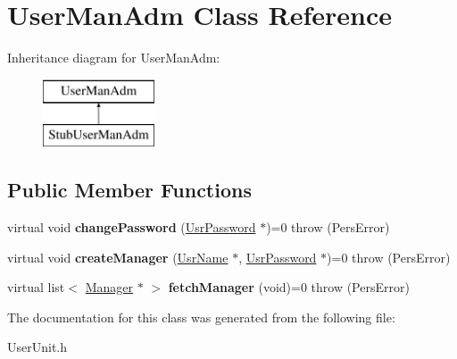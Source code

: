 \hypertarget{classUserManAdm}{\section{User\-Man\-Adm Class Reference}
\label{da/d86/classUserManAdm}
}
Inheritance diagram for User\-Man\-Adm\-:\begin{figure}[H]
\begin{center}
\leavevmode
\includegraphics[height=2.000000cm]{da/d86/classUserManAdm}
\end{center}
\end{figure}
\subsection*{Public Member Functions}
\begin{DoxyCompactItemize}
\item 
\hypertarget{classUserManAdm_a75006ea396a6384bbf47918fe9316bce}{virtual void {\bfseries change\-Password} (\hyperlink{classUsrPassword}{Usr\-Password} $\ast$)=0  throw (\-Pers\-Error)}\label{da/d86/classUserManAdm_a75006ea396a6384bbf47918fe9316bce}

\item 
\hypertarget{classUserManAdm_a4c1d61e8190867eb786cdf97083ba289}{virtual void {\bfseries create\-Manager} (\hyperlink{classUsrName}{Usr\-Name} $\ast$, \hyperlink{classUsrPassword}{Usr\-Password} $\ast$)=0  throw (\-Pers\-Error)}\label{da/d86/classUserManAdm_a4c1d61e8190867eb786cdf97083ba289}

\item 
\hypertarget{classUserManAdm_a9efb85ba1a3cad428e6c0b2dfb044fd8}{virtual list$<$ \hyperlink{classManager}{Manager} $\ast$ $>$ {\bfseries fetch\-Manager} (void)=0  throw (\-Pers\-Error)}\label{da/d86/classUserManAdm_a9efb85ba1a3cad428e6c0b2dfb044fd8}

\end{DoxyCompactItemize}


The documentation for this class was generated from the following file\-:\begin{DoxyCompactItemize}
\item 
User\-Unit.\-h\end{DoxyCompactItemize}
